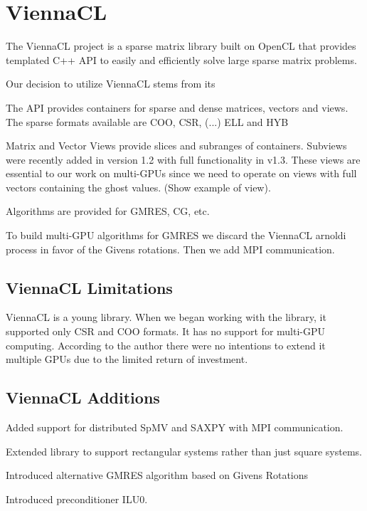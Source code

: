 \documentclass{report}
\begin{document}
\fi



\chapter{ViennaCL}


The ViennaCL project \cite{Rupp2010a, Rupp2010} is a sparse matrix library built on OpenCL that provides templated C++ API to easily and efficiently solve large sparse matrix problems. 

Our decision to utilize ViennaCL stems from its 

The API provides containers for sparse and dense matrices, vectors and views. The sparse formats available are COO, CSR, (...) ELL and HYB

Matrix and Vector Views provide slices and subranges of containers. Subviews were recently added in version 1.2 with full functionality in v1.3. These views are essential to our work on multi-GPUs since we need to operate on views with full vectors containing the ghost values. (Show example of view). 

Algorithms are provided for GMRES, CG, etc. 

To build multi-GPU algorithms for GMRES we discard the ViennaCL arnoldi process in favor of the Givens rotations. Then we add MPI communication. 



\section{ViennaCL Limitations}
ViennaCL is a young library. When we began working with the library, it supported only CSR and COO formats. It has no support for multi-GPU computing. According to the author there were no intentions to extend it multiple GPUs due to the limited return of investment. 

\section{ViennaCL Additions}
Added support for distributed SpMV and SAXPY with MPI communication. 

Extended library to support rectangular systems rather than just square systems. 

Introduced alternative GMRES algorithm based on Givens Rotations

Introduced preconditioner ILU0. 
\end{document}
